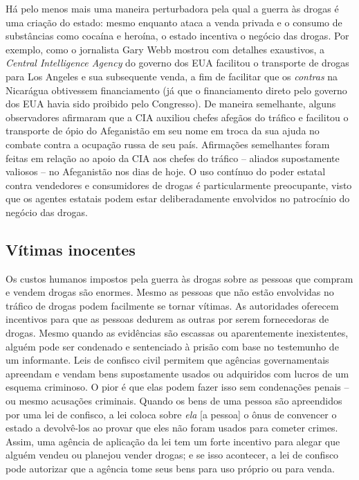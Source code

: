 Há pelo menos mais uma maneira perturbadora pela qual a guerra às drogas é uma criação do estado: mesmo enquanto ataca a venda privada e o consumo de substâncias como cocaína e heroína, o estado incentiva o negócio das drogas. Por exemplo, como o jornalista Gary Webb mostrou com detalhes exaustivos, a \emph{Central Intelligence Agency} do governo dos EUA facilitou o transporte de drogas para Los Angeles e sua subsequente venda, a fim de facilitar que os \emph{contras} na Nicarágua obtivessem financiamento (já que o financiamento direto pelo governo dos EUA havia sido proibido pelo Congresso). De maneira semelhante, alguns observadores afirmaram que a CIA auxiliou chefes afegãos do tráfico e facilitou o transporte de ópio do Afeganistão em seu nome em troca da sua ajuda no combate contra a ocupação russa de seu país. Afirmações semelhantes foram feitas em relação ao apoio da CIA aos chefes do tráfico -- aliados supostamente valiosos -- no Afeganistão nos dias de hoje. O uso contínuo do poder estatal contra vendedores e consumidores de drogas é particularmente preocupante, visto que os agentes estatais podem estar deliberadamente envolvidos no patrocínio do negócio das drogas.

\subsection*{Vítimas inocentes}

Os custos humanos impostos pela guerra às drogas sobre as pessoas que compram e vendem drogas são enormes. Mesmo as pessoas que não estão envolvidas no tráfico de drogas podem facilmente se tornar vítimas. As autoridades oferecem incentivos para que as pessoas dedurem as outras por serem fornecedoras de drogas. Mesmo quando as evidências são escassas ou aparentemente inexistentes, alguém pode ser condenado e sentenciado à prisão com base no testemunho de um informante. Leis de confisco civil permitem que agências governamentais apreendam e vendam bens supostamente usados ou adquiridos com lucros de um esquema criminoso. O pior é que elas podem fazer isso sem condenações penais -- ou mesmo acusações criminais. Quando os bens de uma pessoa são apreendidos por uma lei de confisco, a lei coloca sobre \emph{ela} [a pessoa] o ônus de convencer o estado a devolvê-los ao provar que eles não foram usados para cometer crimes. Assim, uma agência de aplicação da lei tem um forte incentivo para alegar que alguém vendeu ou planejou vender drogas; e se isso acontecer, a lei de confisco pode autorizar que a agência tome seus bens para uso próprio ou para venda.

